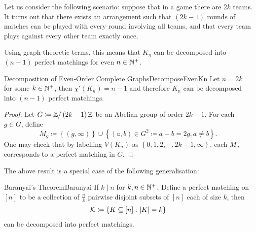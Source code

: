 \documentclass[math]{amznotes}
\theoremstyle{remark}
\begin{document}
Let us consider the following scenario: suppose that in a game there are $2k$ teams. It turns out that there exists an arrangement such that $\left(2k - 1\right)$ rounds of matches can be played with every round involving all teams, and that every team plays against every other team exactly once.

Using graph-theoretic terms, this means that $K_n$ can be decomposed into $\left(n - 1\right)$ perfect matchings for even $n \in \mathbb{N}^+$.
\begin{probox}{Decomposition of Even-Order Complete Graphs}{DecomposeEvenKn}
  Let $n = 2k$ for some $k \in \mathbb{N}^+$, then $\chi'\left(K_n\right) = n - 1$ and therefore $K_n$ can be decomposed into $\left(n - 1\right)$ perfect matchings.
  \tcblower
  \begin{proof}
    Let $G \coloneqq \mathbb{Z} \slash \left(2k - 1\right)\mathbb{Z}$ be an Abelian group of order $2k - 1$. For each $g \in G$, define 
    \begin{equation*}
      M_g \coloneqq \left\{\left(g, \infty\right)\right\} \cup \left\{\left(a, b\right) \in G^2 \coloneqq a + b = 2g, a \neq b\right\}.
    \end{equation*}
    One may check that by labelling $V\left(K_n\right)$ as $\left\{0, 1, 2, \cdots, 2k - 1, \infty\right\}$, each $M_g$ corresponds to a perfect matching in $G$.
  \end{proof}
\end{probox}
The above result is a special case of the following generalisation:
\begin{thmbox}{Baranyai's Theorem}{Baranyai}
  If $k \mid n$ for $k, n \in \mathbb{N}^+$. Define a perfect matching on $\left[n\right]$ to be a collection of $\frac{n}{k}$ pairwise disjoint subsets of $\left[n\right]$ each of size $k$, then 
  \begin{equation*}
    \mathcal{K} \coloneqq \left\{K \subseteq \left[n\right] \colon {\left\lvert {K} \right\rvert} = k\right\}
  \end{equation*}
  can be decomposed into perfect matchings.
\end{thmbox}
\end{document}
